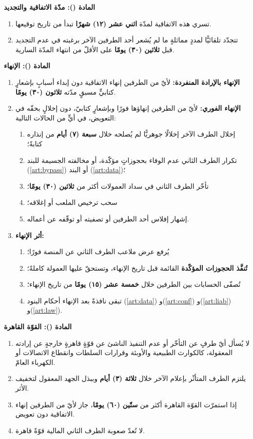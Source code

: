\documentclass[12pt,a4paper]{article}
\newcounter{bndc}
\newcommand{\bnd}[1]{%
  \vspace{10pt}\par\noindent
  {\color{teal}\bfseries\large المادة (\arabic{bndc}): #1}%
  \stepcounter{bndc}%
  \par\vspace{2pt}\noindent{\color{rule}\rule{\linewidth}{0.6pt}}\par\vspace{4pt}%
}
\newcommand{\mlh}[1]{{\bfseries #1}}
\newenvironment{bnditems}
  {\begin{enumerate}[label=\arabic{bndc}.\arabic*,leftmargin=1.6em,itemsep=3pt,topsep=3pt]}
  {\end{enumerate}}
\newenvironment{sublist}
  {\begin{enumerate}[label=(\alph*),leftmargin=1.6em,itemsep=2pt,topsep=2pt]}
  {\end{enumerate}}
\begin{document}
\bnd{مدّة الاتفاقية والتجديد}
\begin{bnditems}
  \item تسري هذه الاتفاقية لمدّة \mlh{اثني عشر (١٢) شهرًا} تبدأ من تاريخ توقيعها.
  \item تتجدّد تلقائيًّا لمددٍ مماثلةٍ ما لم يُشعر أحد الطرفين الآخر برغبته في عدم التجديد قبل \mlh{ثلاثين (٣٠) يومًا} على الأقلّ من انتهاء المدّة السارية.
\end{bnditems}

\bnd{الإنهاء}
\begin{bnditems}
  \item \mlh{الإنهاء بالإرادة المنفردة:} لأيّ من الطرفين إنهاء الاتفاقية دون إبداء أسبابٍ بإشعارٍ كتابيٍّ مسبقٍ مدّته \mlh{ثلاثون (٣٠) يومًا}.
  \item \mlh{الإنهاء الفوري:} لأيّ من الطرفين إنهاؤها فورًا وبإشعارٍ كتابيّ، دون إخلالٍ بحقّه في التعويض، في أيٍّ من الحالات التالية:
  \begin{sublist}
    \item إخلال الطرف الآخر إخلالًا جوهريًّا لم يُصلحه خلال \mlh{سبعة (٧) أيام} من إنذاره كتابةً؛
    \item تكرار الطرف الثاني عدم الوفاء بحجوزاتٍ مؤكّدة، أو مخالفته الجسيمة للبند (\ref{art:bypass}) أو البند (\ref{art:data})؛
    \item تأخّر الطرف الثاني في سداد العمولات أكثر من \mlh{ثلاثين (٣٠) يومًا}؛
    \item سحب ترخيص الملعب أو إغلاقه؛
    \item إشهار إفلاس أحد الطرفين أو تصفيته أو توقّفه عن أعماله.
  \end{sublist}
  \item \mlh{أثر الإنهاء:}
  \begin{sublist}
    \item يُرفع عرض ملاعب الطرف الثاني عن المنصة فورًا؛
    \item \mlh{تُنفَّذ الحجوزات المؤكّدة} القائمة قبل تاريخ الإنهاء، وتستحقّ عليها العمولة كاملةً؛
    \item تُصفّى الحسابات بين الطرفين خلال \mlh{خمسة عشر (١٥) يومًا} من تاريخ الإنهاء؛
    \item تبقى نافذةً بعد الإنهاء أحكام البنود (\ref{art:data}) و(\ref{art:conf}) و(\ref{art:liab}) و(\ref{art:law}).
  \end{sublist}
\end{bnditems}

\bnd{القوّة القاهرة}
\begin{bnditems}
  \item لا يُسأل أيّ طرفٍ عن التأخّر أو عدم التنفيذ الناشئ عن قوّةٍ قاهرةٍ خارجةٍ عن إرادته المعقولة، كالكوارث الطبيعية والأوبئة وقرارات السلطات وانقطاع الاتصالات أو الكهرباء العامّ.
  \item يلتزم الطرف المتأثّر بإعلام الآخر خلال \mlh{ثلاثة (٣) أيام} وببذل الجهد المعقول لتخفيف الأثر.
  \item إذا استمرّت القوّة القاهرة أكثر من \mlh{ستّين (٦٠) يومًا}، جاز لأيّ من الطرفين إنهاء الاتفاقية دون تعويض.
  \item لا تُعدّ صعوبة الطرف الثاني المالية قوّةً قاهرة.
\end{bnditems}
\end{document}
